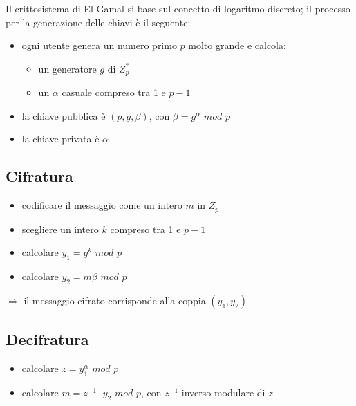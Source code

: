Il crittosistema di El-Gamal si base sul concetto di logaritmo discreto; il processo per 
la generazione delle chiavi è il seguente:
\begin{itemize}
    \item ogni utente genera un numero primo $p$ molto grande e calcola:
    \begin{itemize}
        \item un generatore $g$ di $Z_p^*$
        \item un $\alpha$ casuale compreso tra 1 e $p-1$
    \end{itemize}
    \item la chiave pubblica è $(p, g, \beta)$, con $\beta = g^\alpha$ $mod$ $p$
    \item la chiave privata è $\alpha$
\end{itemize}

\subsection{Cifratura}

\begin{itemize}
    \item codificare il messaggio come un intero $m$ in $Z_p$
    \item scegliere un intero $k$ compreso tra 1 e $p-1$
    \item calcolare $y_1 = g^k$ $mod$ $p$
    \item calcolare $y_2 = m\beta$ $mod$ $p$
\end{itemize}

$\Rightarrow$ il messaggio cifrato corrisponde alla coppia $(y_1, y_2)$

\subsection{Decifratura}
\begin{itemize}
    \item calcolare $z=y_1^\alpha$ $mod$ $p$
    \item calcolare $m = z^{-1} \cdot y_2$ $mod$ $p$, con $z^{-1}$ inverso modulare di $z$
\end{itemize}

